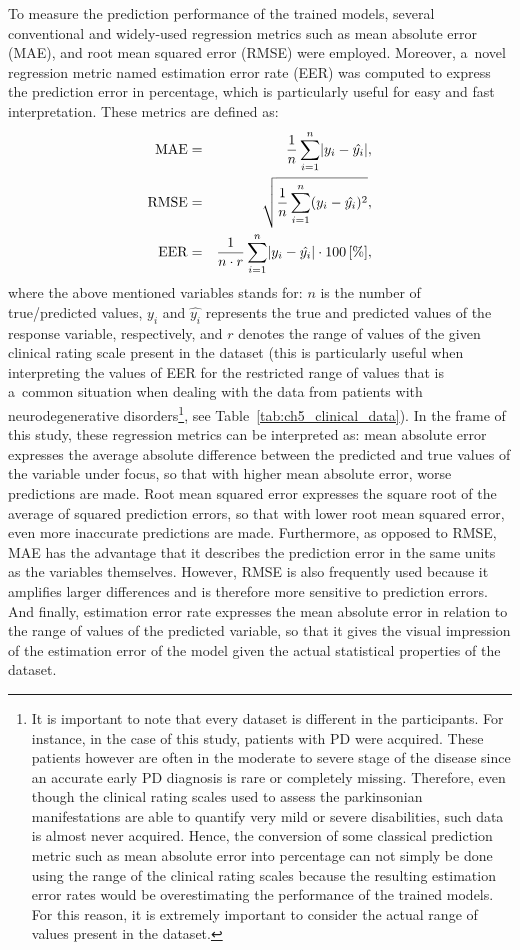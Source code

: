 To measure the prediction performance of the trained models, several conventional and widely-used regression metrics such as mean absolute error (MAE), and root mean squared error (RMSE) were employed. Moreover, a~novel regression metric named estimation error rate (EER) was computed to express the prediction error in percentage, which is particularly useful for easy and fast interpretation. These metrics are defined as:
\begin{eqnarray}
	\mathrm{MAE}  &=& \frac{1}{n}\sum_{i=1}^{n} \lvert y_{i}-\hat{y_{i}}\rvert, \\
	\mathrm{RMSE} &=& \sqrt{\frac{1}{n}\sum_{i=1}^{n} (y_{i}-\hat{y_{i}})^2}, \\
	\mathrm{EER}  &=& \frac{1}{n \cdot r}\sum_{i=1}^{n} \lvert y_{i}-\hat{y_{i}}\rvert \cdot 100\,[\%], 
\end{eqnarray}
where the above mentioned variables stands for: $n$ is the number of true/predicted values, $y_{i}$ and $\hat{y_{i}}$ represents the true and predicted values of the response variable, respectively, and $r$ denotes the range of values of the given clinical rating scale present in the dataset (this is particularly useful when interpreting the values of EER for the restricted range of values that is a~common situation when dealing with the data from patients with neurodegenerative disorders\footnote{It is important to note that every dataset is different in the participants. For instance, in the case of this study, patients with PD were acquired. These patients however are often in the moderate to severe stage of the disease since an accurate early PD diagnosis is rare or completely missing. Therefore, even though the clinical rating scales used to assess the parkinsonian manifestations are able to quantify very mild or severe disabilities, such data is almost never acquired. Hence, the conversion of some classical prediction metric such as mean absolute error into percentage can not simply be done using the range of the clinical rating scales because the resulting estimation error rates would be overestimating the performance of the trained models. For this reason, it is extremely important to consider the actual range of values present in the dataset.}, see Table~\ref{tab:ch5_clinical_data}). In the frame of this study, these regression metrics can be interpreted as: mean absolute error expresses the average absolute difference between the predicted and true values of the variable under focus, so that with higher mean absolute error, worse predictions are made. Root mean squared error expresses the square root of the average of squared prediction errors, so that with lower root mean squared error, even more inaccurate predictions are made. Furthermore, as opposed to RMSE, MAE has the advantage that it describes the prediction error in the same units as the variables themselves. However, RMSE is also frequently used because it amplifies larger differences and is therefore more sensitive to prediction errors. And finally, estimation error rate expresses the mean absolute error in relation to the range of values of the predicted variable, so that it gives the visual impression of the estimation error of the model given the actual statistical properties of the dataset.


